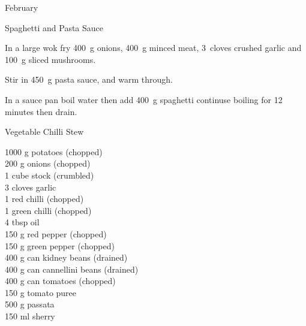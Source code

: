 \begin{menu}{February}
\begin{recipe}{2}{Spaghetti and Pasta Sauce}
\begin{ingredients}
		\end{ingredients}
	
	
    \begin{instructions}
    \item 
        In a large wok fry
        400~g  onions,
        400~g  minced meat,
        3~cloves crushed garlic
        and
        100~g sliced mushrooms.
      \item 
        Stir in
        450~g  pasta sauce,
        and warm through.
      \item 
      In a sauce pan boil water then add
      400~g  spaghetti
      continuse boiling for 12  minutes then drain.
    
    \end{instructions}
    \end{recipe}%
  
    \begin{recipe}{2}{Vegetable Chilli Stew}%
		\begin{ingredients}
		1000 g potatoes (chopped) \\
	200 g onions (chopped) \\
	1 cube stock (crumbled) \\
	3 cloves garlic  \\
	1  red chilli (chopped) \\
	1  green chilli (chopped) \\
	4 tbsp oil  \\
	150 g red pepper (chopped) \\
	150 g green pepper (chopped) \\
	400 g can kidney beans (drained) \\
	400 g can cannellini beans (drained) \\
	400 g can tomatoes (chopped) \\
	150 g tomato puree  \\
	500 g passata  \\
	150 ml sherry  \\
	
		\end{ingredients}
	

\end{recipe}
\end{menu}

